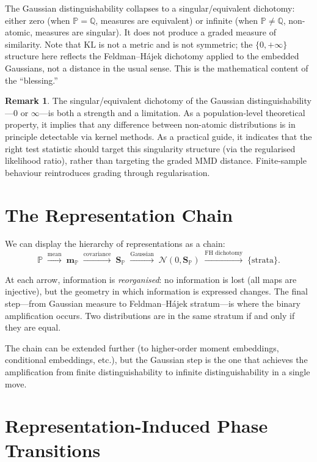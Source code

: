 \documentclass[12pt, oneside]{book}
\theoremstyle{plain}
\theoremstyle{definition}
\newtheorem{remark}[theorem]{Remark}
\newcommand{\calN}{\mathcal{N}}
\newcommand{\PP}{\mathbb{P}}
\newcommand{\QQ}{\mathbb{Q}}
\newcommand{\mP}{\mathbf{m}_{\PP}}
\newcommand{\SP}{\mathbf{S}_{\PP}}
\newcommand{\KL}{\mathrm{KL}}
\begin{document}
The Gaussian distinguishability collapses to a singular/equivalent dichotomy: either zero (when $\PP = \QQ$, measures are equivalent) or infinite (when $\PP \neq \QQ$, non-atomic, measures are singular). It does not produce a graded measure of similarity. Note that $\KL$ is not a metric and is not symmetric; the $\{0,+\infty\}$ structure here reflects the Feldman--H\'ajek dichotomy applied to the embedded Gaussians, not a distance in the usual sense. This is the mathematical content of the ``blessing.''

\begin{remark}
The singular/equivalent dichotomy of the Gaussian distinguishability---$0$ or $\infty$---is both a strength and a limitation. As a population-level theoretical property, it implies that any difference between non-atomic distributions is in principle detectable via kernel methods. As a practical guide, it indicates that the right test statistic should target this singularity structure (via the regularised likelihood ratio), rather than targeting the graded MMD distance. Finite-sample behaviour reintroduces grading through regularisation.
\end{remark}

\section{The Representation Chain}

We can display the hierarchy of representations as a chain:
\begin{equation}
\PP
\;\xrightarrow{\text{mean}}\;
\mP
\;\xrightarrow{\text{covariance}}\;
\SP
\;\xrightarrow{\text{Gaussian}}\;
\calN(0, \SP)
\;\xrightarrow{\text{FH dichotomy}}\;
\{\text{strata}\}.
\end{equation}

At each arrow, information is \emph{reorganised}: no information is lost (all maps are injective), but the geometry in which information is expressed changes. The final step---from Gaussian measure to Feldman--H\'ajek stratum---is where the binary amplification occurs. Two distributions are in the same stratum if and only if they are equal.

The chain can be extended further (to higher-order moment embeddings, conditional embeddings, etc.), but the Gaussian step is the one that achieves the amplification from finite distinguishability to infinite distinguishability in a single move.

\section{Representation-Induced Phase Transitions}
\end{document}
